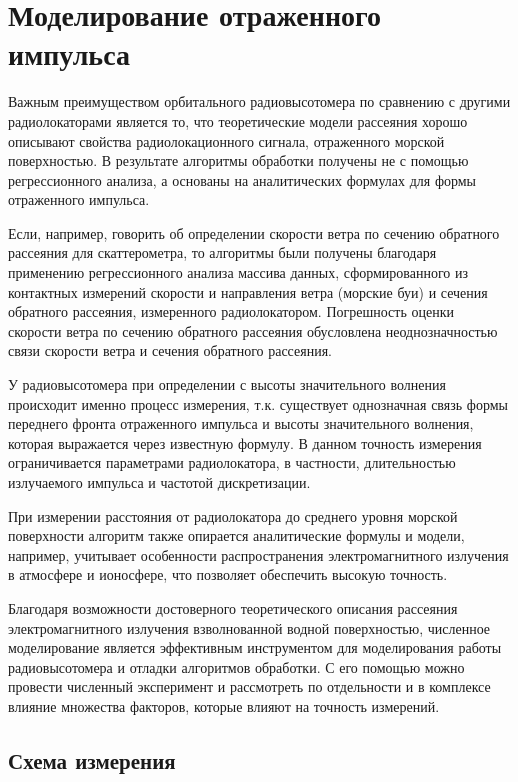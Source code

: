 
\section{Моделирование отраженного импульса}
\label{sec:pulse_modeling}

Важным преимуществом орбитального радиовысотомера по сравнению с другими радиолокаторами является то, что теоретические модели рассеяния хорошо
описывают свойства радиолокационного сигнала, отраженного морской поверхностью.
В результате алгоритмы обработки получены не с помощью регрессионного анализа,
а основаны на аналитических формулах для формы отраженного импульса.

Если, например, говорить об определении скорости ветра по сечению обратного
рассеяния для скаттерометра, то алгоритмы были получены благодаря применению
регрессионного анализа массива данных, сформированного из контактных измерений
скорости и направления ветра (морские буи) и сечения обратного рассеяния,
измеренного радиолокатором. Погрешность оценки скорости ветра
по сечению обратного рассеяния обусловлена неоднозначностью связи скорости
ветра и сечения обратного рассеяния.

У радиовысотомера при определении с высоты значительного волнения происходит
именно процесс измерения, т.к. существует однозначная связь формы переднего
фронта отраженного импульса и высоты значительного волнения, которая выражается
через известную формулу. В данном точность измерения ограничивается параметрами
радиолокатора, в частности, длительностью излучаемого импульса и частотой
дискретизации.

При измерении расстояния от радиолокатора до среднего уровня морской
поверхности алгоритм также опирается аналитические формулы и модели, например,
учитывает особенности распространения электромагнитного излучения в атмосфере и
ионосфере, что позволяет обеспечить высокую точность.

Благодаря возможности достоверного теоретического  описания рассеяния
электромагнитного излучения взволнованной водной поверхностью, численное
моделирование является эффективным инструментом для моделирования работы
радиовысотомера и отладки алгоритмов обработки. С его помощью можно провести
численный эксперимент и рассмотреть по отдельности и в комплексе влияние
множества факторов, которые влияют на точность измерений.

\subsection{Схема измерения}%
\label{sub:skhema_izmereniia}


